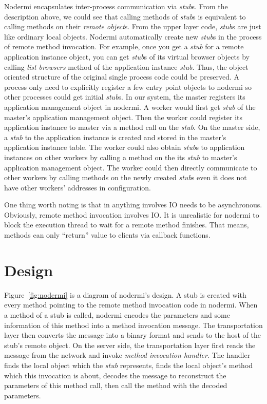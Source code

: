 Nodermi encapsulates inter-process communication via \emph{stub}s.
From the description above, we could see that
calling methods of \emph{stub}s is equivalent to calling methods
on their \emph{remote object}s.
From the upper layer code, \emph{stub}s are just like ordinary local objects.
Nodermi automatically create new \emph{stub}s in the process
 of remote method invocation.
For example, once you get a \emph{stub} for a remote application instance object,
you can get \emph{stub}s of its virtual browser objects by calling
\emph{list browsers} method of the application instance \emph{stub}.
Thus, the object oriented structure of the original single process code could
be preserved.
A process only need to explicitly register a few entry point objects to nodermi 
so other processes could get initial \emph{stub}s.
In our system, the master registers its application management object in nodermi.
A worker would first get \emph{stub} of the master's application management object.
Then the worker could register its application instance to master 
via a method call on the \emph{stub}.
On the master side, a \emph{stub} to the application instance is created and
stored in the master's application instance table.
The worker could also obtain \emph{stub}s to application instances on other workers by 
calling a method on the its \emph{stub} to master's application management object.
The worker could then directly communicate to other workers
by calling methods on the newly created \emph{stub}s 
even it does not have other workers' addresses in configuration.

One thing worth noting is that in \nodejs anything involves IO
needs to be asynchronous. 
Obviously, remote method invocation involves IO.
It is unrealistic for nodermi to block the execution thread to wait
for a remote method finishes.
That means, methods can only ``return'' value to clients via
callback functions.



\nodermifig{}

\section{Design}
Figure~\ref{fig:nodermi} is a diagram of nodermi's design.
A stub is created with every method pointing to the 
remote method invocation code in nodermi.
When a method of a stub is called,
nodermi encodes the parameters and some information of this method 
into a method invocation message.
The transportation layer then converts the message into 
a binary format and sends to the host of the stub's remote object.
On the server side, the transportation layer first reads 
the message from the network and invoke \emph{method invocation handler}.
The handler finds the local object which the \emph{stub}
represents,
finds the local object's method which this invocation is about,
decodes the message to reconstruct the parameters of this method call,
then call the method with the decoded parameters.



